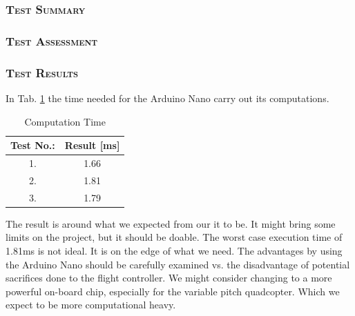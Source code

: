 \subsubsection*{\textsc{\medium Test Summary}}


\subsubsection*{\textsc{\medium Test Assessment}}


\subsubsection*{\textsc{\medium Test Results}}
In Tab. \ref{tab:tab5} the time needed for the Arduino Nano carry out its computations.  
\begin {table}[H]
    \begin{center}
    \caption {Computation Time} 
    \label{tab:tab5} 
    \begin{tabular}{|c|c|}\hline 
        Test No.: &  Result [ms]\\ \hline
        1. & 1.66 \\ \hline
        2. & 1.81 \\ \hline
        3. & 1.79 \\ \hline
    \end{tabular}
    \end{center}
\end{table}
The result is around what we expected from our it to be. It might bring
some limits on the project, but it should be doable. The worst case execution time of 1.81ms is not ideal. It is on the edge of what we need.  The advantages by using the Arduino Nano should be carefully examined vs.  the disadvantage of potential sacrifices done to the flight controller.  We might consider changing
to a more powerful on-board chip, especially for the variable pitch quadcopter.
Which we expect to be more computational heavy.

